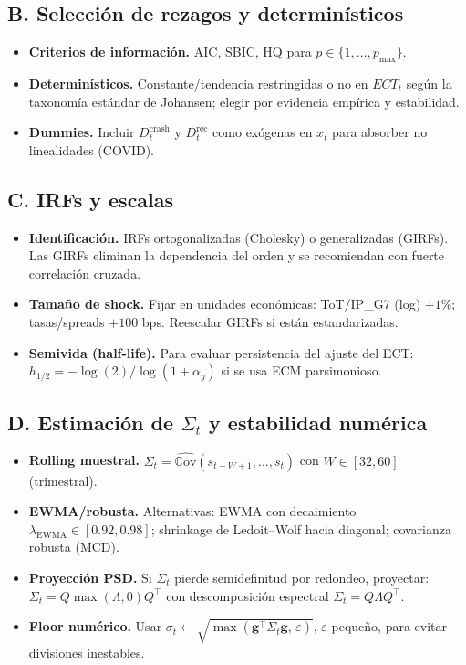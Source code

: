 \documentclass[11pt,a4paper]{article}
\newcommand{\Cov}{\mathbb{C}\text{ov}}
\newcommand{\1}{\mathbf{1}}
\newcommand{\vect}[1]{\boldsymbol{#1}}
\begin{document}
\subsection*{B. Selección de rezagos y determinísticos}
\begin{itemize}
  \item \textbf{Criterios de información.} AIC, SBIC, HQ para $p\in\{1,\dots,p_{\max}\}$.
  \item \textbf{Determinísticos.} Constante/tendencia restringidas o no en $ECT_t$ según la taxonomía estándar de Johansen; elegir por evidencia empírica y estabilidad.
  \item \textbf{Dummies.} Incluir $D^{\text{crash}}_t$ y $D^{\text{rec}}_t$ como exógenas en $x_t$ para absorber no linealidades (COVID).
\end{itemize}

\subsection*{C. IRFs y escalas}
\begin{itemize}
  \item \textbf{Identificación.} IRFs ortogonalizadas (Cholesky) o generalizadas (GIRFs). Las GIRFs eliminan la dependencia del orden y se recomiendan con fuerte correlación cruzada.
  \item \textbf{Tamaño de shock.} Fijar en unidades económicas: ToT/IP\_G7 (log) $+1\%$; tasas/spreads $+100$ bps. Reescalar GIRFs si están estandarizadas.
  \item \textbf{Semivida (half-life).} Para evaluar persistencia del ajuste del ECT: $h_{1/2} = -\log(2)/\log(1+\alpha_y)$ si se usa ECM parsimonioso.
\end{itemize}

\subsection*{D. Estimación de \texorpdfstring{$\Sigma_t$}{Sigma\_t} y estabilidad numérica}
\begin{itemize}
  \item \textbf{Rolling muestral.} $\Sigma_t=\widehat{\Cov}(s_{t-W+1},\ldots,s_t)$ con $W\in[32,60]$ (trimestral).
  \item \textbf{EWMA/robusta.} Alternativas: EWMA con decaimiento $\lambda_{\text{EWMA}}\in[0.92,0.98]$; shrinkage de Ledoit--Wolf hacia diagonal; covarianza robusta (MCD).
  \item \textbf{Proyección PSD.} Si $\Sigma_t$ pierde semidefinitud por redondeo, proyectar: $\Sigma_t = Q \max(\Lambda,0) Q^\top$ con descomposición espectral $\Sigma_t=Q\Lambda Q^\top$.
  \item \textbf{Floor numérico.} Usar $\sigma_t \leftarrow \sqrt{\max(\vect{g}^\top \Sigma_t \vect{g},\,\varepsilon)}$, $\varepsilon$ pequeño, para evitar divisiones inestables.
\end{itemize}
\end{document}

